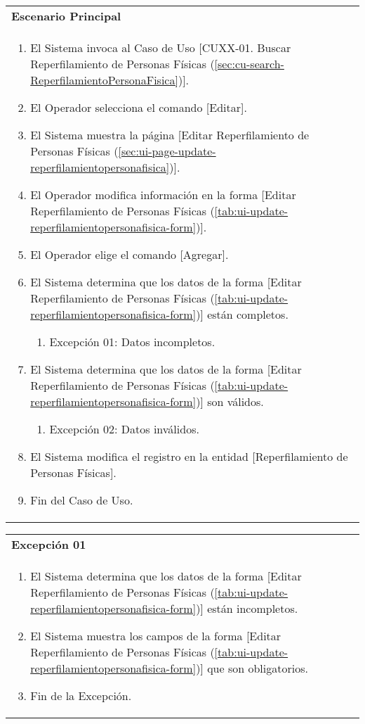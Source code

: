 	\begin{tabular}{ p{15.5cm} }
		\textbf{Escenario Principal} \\
		\begin{enumerate}
			\item El Sistema invoca al Caso de Uso [CUXX-01. Buscar Reperfilamiento de Personas F\'isicas (\ref{sec:cu-search-ReperfilamientoPersonaFisica})].
			\item El Operador selecciona el comando [Editar].
			\item El Sistema muestra la p\'agina [Editar Reperfilamiento de Personas F\'isicas (\ref{sec:ui-page-update-reperfilamientopersonafisica})].
			\item El Operador modifica informaci\'on en la forma [Editar Reperfilamiento de Personas F\'isicas (\ref{tab:ui-update-reperfilamientopersonafisica-form})].
			\item El Operador elige el comando [Agregar].
			\item El Sistema determina que los datos de la forma [Editar Reperfilamiento de Personas F\'isicas (\ref{tab:ui-update-reperfilamientopersonafisica-form})] est\'an completos.
				\begin{enumerate}
					\item Excepci\'on 01: Datos incompletos.
				\end{enumerate}
			\item El Sistema determina que los datos de la forma [Editar Reperfilamiento de Personas F\'isicas (\ref{tab:ui-update-reperfilamientopersonafisica-form})] son v\'alidos.
				\begin{enumerate}
					\item Excepci\'on 02: Datos inv\'alidos.
				\end{enumerate}
			\item El Sistema modifica el registro en la entidad [Reperfilamiento de Personas F\'isicas].
			\item Fin del Caso de Uso.
		\end{enumerate}
	\end{tabular}
	
	\begin{tabular}{ p{15.5cm} }
		\textbf{Excepci\'on 01} \\
		\begin{enumerate}
			\item El Sistema determina que los datos de la forma [Editar Reperfilamiento de Personas F\'isicas (\ref{tab:ui-update-reperfilamientopersonafisica-form})] est\'an incompletos.
			\item El Sistema muestra los campos de la forma [Editar Reperfilamiento de Personas F\'isicas (\ref{tab:ui-update-reperfilamientopersonafisica-form})] que son obligatorios.
			\item Fin de la Excepci\'on.
		\end{enumerate}
	\end{tabular}
	
